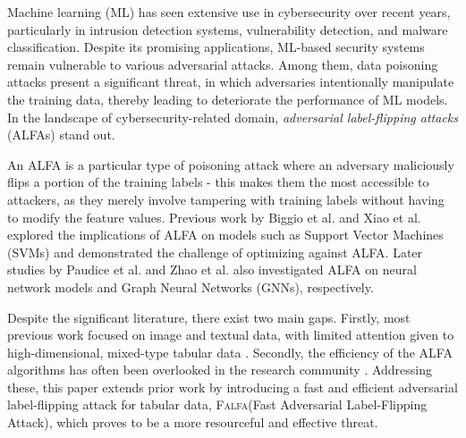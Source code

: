 \documentclass[runningheads]{llncs}
\newcommand{\falfa}{\textsc{Falfa}\xspace}
\begin{document}
Machine learning (ML) has seen extensive use in cybersecurity over recent years, particularly in intrusion detection systems, vulnerability detection, and malware classification. Despite its promising applications, ML-based security systems remain vulnerable to various adversarial attacks. Among them, data poisoning attacks present a significant threat, in which adversaries intentionally manipulate the training data, thereby leading to deteriorate the performance of ML models. In the landscape of cybersecurity-related domain, \emph{adversarial label-flipping attacks} (ALFAs) stand out. 

An ALFA is a particular type of poisoning attack where an adversary maliciously flips a portion of the training labels - this makes them the most accessible to attackers, as they merely involve tampering with training labels without having to modify the feature values. Previous work by Biggio et al.\cite{biggio2011support} and Xiao et al.\cite{xiao2012adversarial} explored the implications of ALFA on models such as Support Vector Machines (SVMs) and demonstrated the challenge of optimizing against ALFA. Later studies by Paudice et al. \cite{paudice2018label} and Zhao et al. \cite{zhang2020adversarial} also investigated ALFA on neural network models and Graph Neural Networks (GNNs), respectively.

Despite the significant literature, there exist two main gaps. Firstly, most previous work focused on image and textual data, with limited attention given to high-dimensional, mixed-type tabular data \cite{li2021detection}. Secondly, the efficiency of the ALFA algorithms has often been overlooked in the research community \cite{taheri2020defending,aryal2022analysis}. Addressing these, this paper extends prior work by introducing a fast and efficient adversarial label-flipping attack for tabular data, \falfa (Fast Adversarial Label-Flipping Attack), which proves to be a more resourceful and effective threat. 
\end{document}
